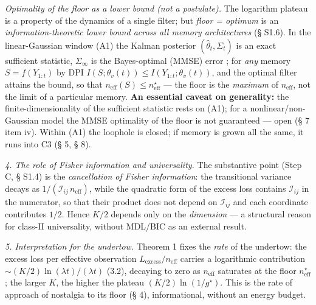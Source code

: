 \documentclass[12pt]{iopart}
\begin{document}
\emph{Optimality of the floor as a lower bound (not a postulate).} The logarithm plateau is a property of the dynamics of a single filter; but \emph{floor = optimum} is an \emph{information-theoretic lower bound across all memory architectures} (§ S1.6). In the linear-Gaussian window (A1) the Kalman posterior \((\hat\theta_t,\Sigma_t)\) is an exact sufficient statistic, \(\Sigma_\infty\) is the Bayes-optimal (MMSE) error \cite{AndersonMoore1979,KalmanBucy1961}; for \emph{any} memory \(S = f(Y_{1:t})\) by DPI \(I(S;\theta_v(t)) \le I(Y_{1:t};\theta_v(t))\), and the optimal filter attains the bound, so that \(n_{\text{eff}}(S) \le n_{\text{eff}}^\star\) --- the floor is the \emph{maximum} of \(n_{\text{eff}}\), not the limit of a particular memory. \textbf{An essential caveat on generality:} the finite-dimensionality of the sufficient statistic rests on (A1); for a nonlinear/non-Gaussian model the MMSE optimality of the floor is not guaranteed --- open (§ 7 item iv). Within (A1) the loophole is closed; if memory is grown all the same, it runs into C3 (§ 5, § 8).



\emph{4. The role of Fisher information and universality.} The substantive point (Step C, § S1.4) is the \emph{cancellation of Fisher information}: the transitional variance decays as \(1/(\mathcal I_{ij}\,n_{\text{eff}})\), while the quadratic form of the excess loss contains \(\mathcal I_{ij}\) in the numerator, so that their product does not depend on \(\mathcal I_{ij}\) and each coordinate contributes \(1/2\). Hence \(K/2\) depends only on the \emph{dimension} --- a structural reason for class-II universality, without MDL/BIC as an external result.



\emph{5. Interpretation for the undertow.} Theorem 1 fixes the \emph{rate} of the undertow: the excess loss per effective observation \(L_{\text{excess}}/n_{\text{eff}}\) carries a logarithmic contribution \(\sim (K/2)\ln(\lambda t)/(\lambda t)\) (3.2), decaying to zero as \(n_{\text{eff}}\) saturates at the floor \(n_{\text{eff}}^\star\); the larger \(K\), the higher the plateau \((K/2)\ln(1/g^\star)\). This is the rate of approach of nostalgia to its floor (§ 4), informational, without an energy budget.
\end{document}
